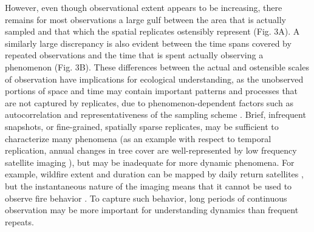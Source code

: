 \documentclass[12pt]{article}
\begin{document}
However, even though observational extent appears to be increasing, there remains for most observations a large gulf between the area that is actually sampled and that which the spatial replicates ostensibly represent (Fig. 3A). A similarly large discrepancy is also evident between the time spans covered by repeated observations and the time that is spent actually observing a phenomenon (Fig. 3B). These differences between the actual and ostensible scales of observation have implications for ecological understanding, as the unobserved portions of space and time may contain important patterns and processes that are not captured by replicates, due to phenomenon-dependent factors such as autocorrelation and representativeness of the sampling scheme \cite{underwood_experiments_1997,palmer_scale_1994, cao_comparison_2002, legendre_spatial_1993,collins_method_2000}. Brief, infrequent snapshots, or fine-grained, spatially sparse replicates, may be sufficient to characterize many phenomena (as an example with respect to temporal replication, annual changes in tree cover are well-represented by low frequency satellite imaging \cite{hansen_high-resolution_2013}), but may be inadequate for more dynamic phenomena. For example, wildfire extent and duration can be mapped by daily return satellites \cite{roy_prototyping_2005,jones_fire_2009}, but the instantaneous nature of the imaging means that it cannot be used to observe fire behavior \cite{clements_observing_2007}. To capture such behavior, long periods of continuous observation may be more important for understanding dynamics than frequent repeats. 
\end{document}

